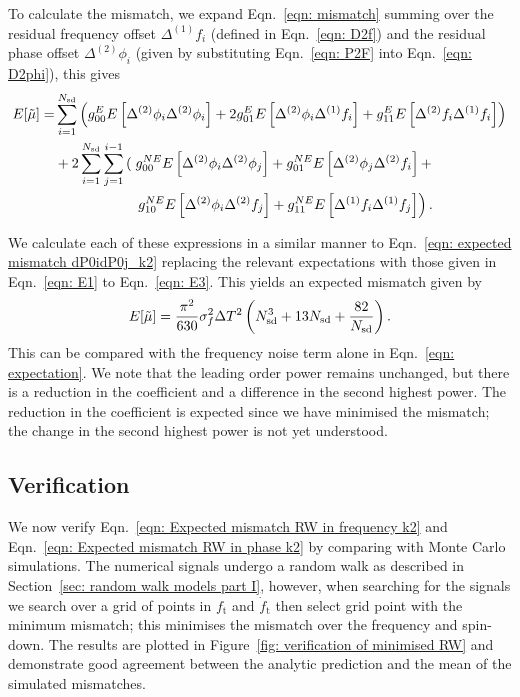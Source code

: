 \documentclass[../full_thesis/full_thesis.tex]{subfiles}
\begin{document}
To calculate the mismatch, we expand Eqn.~\eqref{eqn: mismatch} summing over
the residual frequency offset $\Delta^{(1)}f_i$ (defined in Eqn.~\eqref{eqn:
D2f}) and the residual phase offset $\Delta^{(2)}\phi_i$ (given by
substituting Eqn.~\eqref{eqn: P2F} into Eqn.~\eqref{eqn: D2phi}), this gives
\begin{align}
\begin{split}
E[\mutilde] = &
\s{i=1}{\Nsd}\left(g_{00}^{E}E\left[\Delta^{(2)}\phi_{i}\Delta^{(2)}\phi_{i}\right]
+ 2 g_{01}^{E}E\left[\Delta^{(2)}\phi_{i}\Delta^{(1)}\f_{i}\right]
+  g_{11}^{E} E\left[\Delta^{(2)}\f_{i}\Delta^{(1)}\f_{i}\right] \right) \\
& + 2\s{i=1}{\Nsd}\s{j=1}{i-1}\left(\right.
g_{00}^{NE}E\left[\Delta^{(2)}\phi_{i}\Delta^{(2)}\phi_{j}\right] +
g_{01}^{NE}E\left[\Delta^{(2)}\phi_{j}\Delta^{(2)}\f_{i}\right] +  \\
&\hspace{20mm}\left. g_{10}^{NE}E\left[\Delta^{(2)}\phi_{i}\Delta^{(2)}\f_{j}\right] +
g_{11}^{NE} E\left[\Delta^{(1)}\f_{i}\Delta^{(1)}\f_{j}\right] \right).
\end{split}
\end{align}


We calculate each of these expressions in a similar manner to Eqn.~\eqref{eqn:
expected mismatch dP0idP0j_k2} replacing the relevant expectations with those
given in Eqn.~\eqref{eqn: E1} to Eqn.~\eqref{eqn: E3}. This yields an expected
mismatch given by
\begin{equation}
E[\tilde{\mu}] = \frac{\pi^{2} }{630} \sigma_{f}^{2} \Delta T^{2}  \left(N_{\textrm{sd}}^{3} + 13N_{\textrm{sd}} + \frac{82}{N_{\textrm{sd}}} \right).
\label{eqn: Expected mismatch RW in frequency k2}
\end{equation}
This can be compared with the frequency noise term alone in Eqn.~\eqref{eqn:
expectation}. We note that the leading order power remains unchanged, but there
is a reduction in the coefficient and a difference in the second highest
power. The reduction in the coefficient is expected since we have minimised
the mismatch; the change in the second highest power is not yet understood.

\subsection{Verification}

We now verify Eqn.~\eqref{eqn: Expected mismatch RW in frequency k2} and
Eqn.~\eqref{eqn: Expected mismatch RW in phase k2} by comparing with Monte
Carlo simulations. The numerical signals undergo a random walk as described in
Section~\ref{sec: random walk models part I}, however, when searching for the
signals we search over a grid of points in $f_\textrm{t}$ and
$\dot{f}_\textrm{t}$ then select grid point with the minimum mismatch; this
minimises the mismatch over the frequency and spin-down. The results are
plotted in Figure~\ref{fig: verification of minimised RW} and demonstrate good
agreement between the analytic prediction and the mean of the simulated
mismatches.
\end{document}

